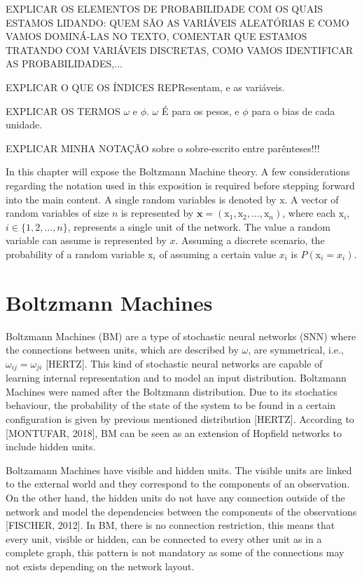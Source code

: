 EXPLICAR OS ELEMENTOS DE PROBABILIDADE COM OS QUAIS ESTAMOS LIDANDO:%
QUEM S\~{A}O AS VARI\'{A}VEIS ALEAT\'{O}RIAS E COMO VAMOS DOMIN\'{A}-LAS NO TEXTO,
COMENTAR QUE ESTAMOS TRATANDO COM VARI\'{A}VEIS DISCRETAS, COMO VAMOS IDENTIFICAR AS PROBABILIDADES,$\ldots$

EXPLICAR O QUE OS \'{I}NDICES REPResentam, e as vari\'{a}veis.

EXPLICAR OS TERMOS $\omega$ e $\phi$. $\omega$ \'{E} para os pesos, e $\phi$ para o bias de cada unidade.

EXPLICAR MINHA NOTA\c{C}\~{A}O sobre o sobre-escrito entre par\^{e}nteses!!!


In this chapter will expose the Boltzmann Machine theory. 
A few considerations regarding the notation used in this exposition is required before stepping forward into the main content. 
A single random variables is denoted by $\mathrm{x}$.
A vector of random variables of size $n$ is represented by $\mathrm{\mathbf{x}} = (\mathrm{x}_{1}, \mathrm{x}_{2}, \dots, \mathrm{x}_{n})$, where each $\mathrm{x}_{i}$, $i \in \{1, 2, \dots, n\}$, represents a single unit of the network. 
The value a random variable can assume is represented by $x$. 
Assuming a discrete scenario, the probability of a random variable $\mathrm{x}_{i}$ of assuming a certain value $x_{i}$ is $P(\mathrm{x}_{i} = x_{i})$. 


\section{Boltzmann Machines}

Boltzmann Machines (BM) are a type of stochastic neural networks (SNN) where the connections between units, which are described by $\omega$, are symmetrical, i.e., $\omega_{ij} = \omega_{ji}$ [HERTZ].
This kind of stochastic neural networks are capable of learning internal representation and to model an input distribution.
Boltzmann Machines were named after the Boltzmann distribution.
Due to its stochatics behaviour, the probability of the state of the system to be found in a certain configuration is given by previous mentioned distribution [HERTZ].
According to [MONTUFAR, 2018], BM can be seen as an extension of Hopfield networks to include hidden units.

Boltzamann Machines have visible and hidden units.
The visible units are linked to the external world and they correspond to the components of an observation. On the other hand, the hidden units do not have any connection outside of the network and model the dependencies between the components of the observations [FISCHER, 2012].
In BM, there is no connection restriction, this means that every unit, visible or hidden, can be connected to every other unit as in a complete graph, this pattern is not mandatory as some of the connections may not exists depending on the network layout.



